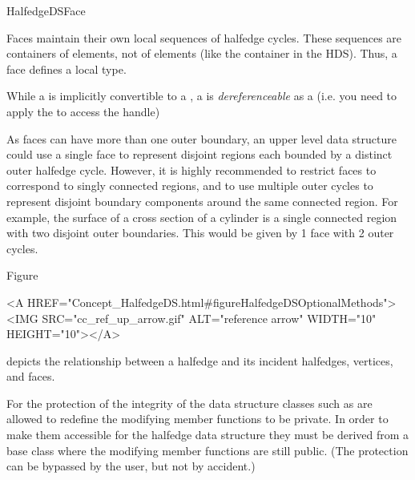 \begin{ccRefConcept}{HalfedgeDSFace}
\begin{ccAdvanced}
{Faces maintain their own local sequences of halfedge cycles. These sequences are
containers of  elements, not of  elements (like the
container in the HDS). Thus, a face defines a local  type.

While a  is implicitly convertible to a ,
a  is {\em dereferenceable} as a  
(i.e. you need to apply the  to access the handle)
}
\end{ccAdvanced}

\begin{ccAdvanced}
{\XHDS
As faces can have more than one outer boundary, an upper level data structure could use a single
face to represent disjoint regions each bounded by a distinct outer halfedge cycle. However,
it is highly recommended to restrict faces to correspond to singly connected regions, and
to use multiple outer cycles to represent disjoint boundary components around the same 
connected region. For example, the surface of a cross section of a cylinder is a single
connected region with two disjoint outer boundaries. This would be given by 1 face with
2 outer cycles.
}
\end{ccAdvanced}

Figure~\begin{ccHtmlOnly}
  <A HREF="Concept_HalfedgeDS.html#figureHalfedgeDSOptionalMethods"><IMG 
  SRC="cc_ref_up_arrow.gif" ALT="reference arrow" WIDTH="10" HEIGHT="10"></A>
\end{ccHtmlOnly}
depicts the relationship between a halfedge and its incident
halfedges, vertices, and faces.

For the protection of the integrity of the data structure classes such as
 are allowed to redefine the modifying member 
functions to be private. In order to make them accessible for the 
halfedge data structure they must be derived from a base class 
where the modifying member functions are still public. (The protection
can be bypassed by the user, but not by accident.)


\ccTypes

\ccThreeToTwo


\end{ccRefConcept}
